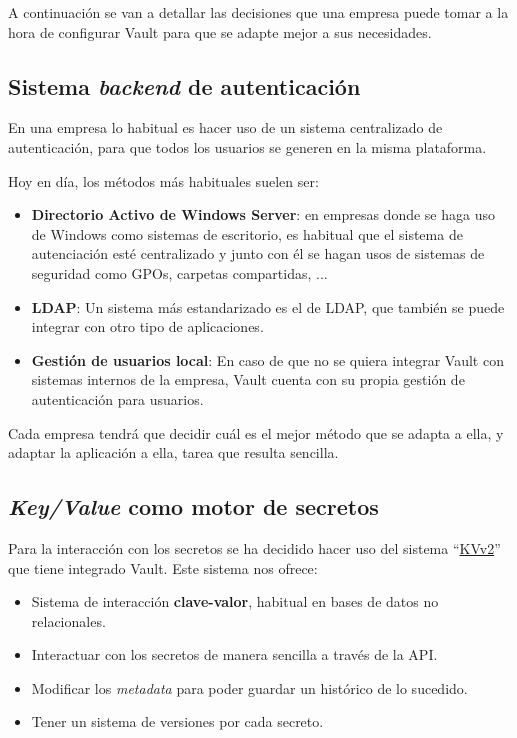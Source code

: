 \documentclass{\ClassPath/viu-tfm-template}
\begin{document}
A continuación se van a detallar las decisiones que una empresa puede tomar a la hora de configurar Vault para que se adapte mejor a sus necesidades.

\subsection{Sistema \textit{backend} de autenticación}

En una empresa lo habitual es hacer uso de un sistema centralizado de autenticación, para que todos los usuarios se generen en la misma plataforma.

Hoy en día, los métodos más habituales suelen ser:
\begin{itemize}
    \item \textbf{Directorio Activo de Windows Server}: en empresas donde se haga uso de Windows como sistemas de escritorio, es habitual que el sistema de autenciación esté centralizado y junto con él se hagan usos de sistemas de seguridad como GPOs, carpetas compartidas, ...
    \item \textbf{LDAP}: Un sistema más estandarizado es el de LDAP, que también se puede integrar con otro tipo de aplicaciones.

    \item \textbf{Gestión de usuarios local}: En caso de que no se quiera integrar Vault con sistemas internos de la empresa, Vault cuenta con su propia gestión de autenticación para usuarios.
\end{itemize}

Cada empresa tendrá que decidir cuál es el mejor método que se adapta a ella, y adaptar la aplicación a ella, tarea que resulta sencilla.


\subsection{\textit{Key/Value} como motor de secretos}
Para la interacción con los secretos se ha decidido hacer uso del sistema “\href{https://developer.hashicorp.com/vault/api-docs/secret/kv/kv-v2}{KVv2}” que tiene integrado Vault. Este sistema nos ofrece:

\begin{itemize}
    \item Sistema de interacción \textbf{clave-valor}, habitual en bases de datos no relacionales.
    \item Interactuar con los secretos de manera sencilla a través de la API.
    \item Modificar los \textit{metadata} para poder guardar un histórico de lo sucedido.
    \item Tener un sistema de versiones por cada secreto.
\end{itemize}
\end{document}
